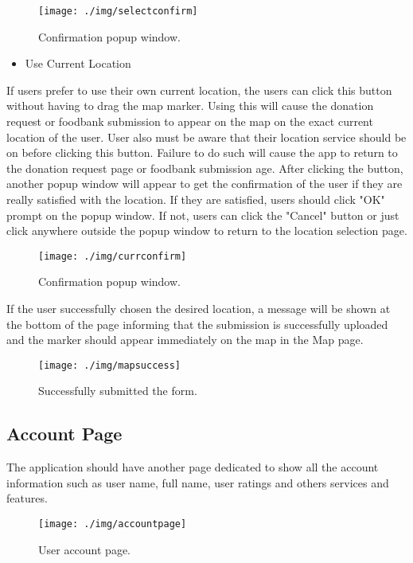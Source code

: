 \documentclass[conference]{IEEEtran}
\begin{document}
\begin{figure}[h!]
\texttt{[image: ./img/selectconfirm]}
\centering
\caption{Confirmation popup window.}
\end{figure}
\begin{itemize}
\item Use Current Location
\end{itemize}
If users prefer to use their own current location, the users can click this button without having to drag the map marker. Using this will cause the donation request or foodbank submission to appear on the map on the exact current location of the user. User also must be aware that their location service should be on before clicking this button. Failure to do such will cause the app to return to the donation request page or foodbank submission age. After clicking the button, another popup window will appear to get the confirmation of the user if they are really satisfied with the location. If they are satisfied, users should click "OK" prompt on the popup window. If not, users can click the "Cancel" button or just click anywhere outside the popup window to return to the location selection page. 

\begin{figure}[h!]
\texttt{[image: ./img/currconfirm]}
\centering
\caption{Confirmation popup window.}
\end{figure}
If the user successfully chosen the desired location, a message will be shown at the bottom of the page informing that the submission is successfully uploaded and the marker should appear immediately on the map in the Map page.

\begin{figure}[h!]
\texttt{[image: ./img/mapsuccess]}
\centering
\caption{Successfully submitted the form.}
\end{figure}

\subsection{Account Page}

\par The application should have another page dedicated to show all the account information such as user name, full name, user ratings and others services and features. 

\begin{figure}[h!]
\texttt{[image: ./img/accountpage]}
\centering
\caption{User account page.}
\end{figure}
\end{document}
